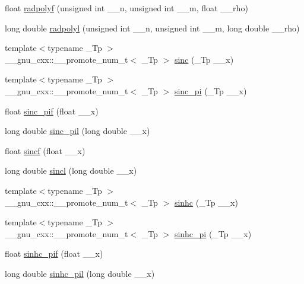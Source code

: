\begin{DoxyCompactItemize}
\item 
float \hyperlink{namespace____gnu__cxx_a8a98d7c7c14f1aadff90123a114fa2c9}{radpolyf} (unsigned int \+\_\+\+\_\+n, unsigned int \+\_\+\+\_\+m, float \+\_\+\+\_\+rho)
\item 
long double \hyperlink{namespace____gnu__cxx_a377febebd1096400897170bb7a76cd3a}{radpolyl} (unsigned int \+\_\+\+\_\+n, unsigned int \+\_\+\+\_\+m, long double \+\_\+\+\_\+rho)
\item 
{\footnotesize template$<$typename \+\_\+\+Tp $>$ }\\\+\_\+\+\_\+gnu\+\_\+cxx\+::\+\_\+\+\_\+promote\+\_\+num\+\_\+t$<$ \+\_\+\+Tp $>$ \hyperlink{namespace____gnu__cxx_ab0697cae10f8981fa700ab81c67a7746}{sinc} (\+\_\+\+Tp \+\_\+\+\_\+x)
\item 
{\footnotesize template$<$typename \+\_\+\+Tp $>$ }\\\+\_\+\+\_\+gnu\+\_\+cxx\+::\+\_\+\+\_\+promote\+\_\+num\+\_\+t$<$ \+\_\+\+Tp $>$ \hyperlink{namespace____gnu__cxx_acfca76a0549d5c42394e1597f83414da}{sinc\+\_\+pi} (\+\_\+\+Tp \+\_\+\+\_\+x)
\item 
float \hyperlink{namespace____gnu__cxx_ad92d43d5332c80d1a27c90bfe3f6417e}{sinc\+\_\+pif} (float \+\_\+\+\_\+x)
\item 
long double \hyperlink{namespace____gnu__cxx_aad38a6e40b1272391a26dbb32a684b3c}{sinc\+\_\+pil} (long double \+\_\+\+\_\+x)
\item 
float \hyperlink{namespace____gnu__cxx_aa87f0734cfe7823c932511ac2f0a876c}{sincf} (float \+\_\+\+\_\+x)
\item 
long double \hyperlink{namespace____gnu__cxx_a79a8fd931f5ad4f737e2931e636149ac}{sincl} (long double \+\_\+\+\_\+x)
\item 
{\footnotesize template$<$typename \+\_\+\+Tp $>$ }\\\+\_\+\+\_\+gnu\+\_\+cxx\+::\+\_\+\+\_\+promote\+\_\+num\+\_\+t$<$ \+\_\+\+Tp $>$ \hyperlink{namespace____gnu__cxx_ad6975a69b8e40a6237b4124b459c6181}{sinhc} (\+\_\+\+Tp \+\_\+\+\_\+x)
\item 
{\footnotesize template$<$typename \+\_\+\+Tp $>$ }\\\+\_\+\+\_\+gnu\+\_\+cxx\+::\+\_\+\+\_\+promote\+\_\+num\+\_\+t$<$ \+\_\+\+Tp $>$ \hyperlink{namespace____gnu__cxx_a59ba25b4276fea8c628629420b522b15}{sinhc\+\_\+pi} (\+\_\+\+Tp \+\_\+\+\_\+x)
\item 
float \hyperlink{namespace____gnu__cxx_a26e54504db6541550266140f5264acbe}{sinhc\+\_\+pif} (float \+\_\+\+\_\+x)
\item 
long double \hyperlink{namespace____gnu__cxx_aa572bf7633f457c86cef65bfd6ec4ad9}{sinhc\+\_\+pil} (long double \+\_\+\+\_\+x)

\end{DoxyCompactItemize}
